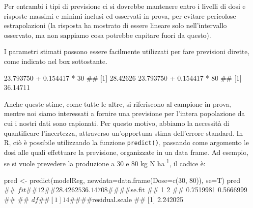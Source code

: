 \documentclass[a4paper,12pt,oneside]{book}
\newenvironment{Shaded}{\begin{snugshade}}{\end{snugshade}}
\newcommand{\DecValTok}[1]{#1}
\newcommand{\FloatTok}[1]{#1}
\newcommand{\SpecialCharTok}[1]{#1}
\newcommand{\DocumentationTok}[1]{#1}
\newcommand{\OtherTok}[1]{#1}
\newcommand{\FunctionTok}[1]{#1}
\newcommand{\AttributeTok}[1]{#1}
\newcommand{\NormalTok}[1]{#1}
\begin{document}
Per entrambi i tipi di previsione ci si dovrebbe mantenere entro i livelli di dosi e risposte massimi e minimi inclusi ed osservati in prova, per evitare pericolose estrapolazioni (la risposta ha mostrato di essere lineare solo nell'intervallo osservato, ma non sappiamo cosa potrebbe capitare fuori da questo).

I parametri stimati possono essere facilmente utilizzati per fare previsioni dirette, come indicato nel box sottostante.

\begin{Shaded}
\begin{Highlighting}[]
\FloatTok{23.793750} \SpecialCharTok{+} \FloatTok{0.154417} \SpecialCharTok{*} \DecValTok{30}
\DocumentationTok{\#\# [1] 28.42626}
\FloatTok{23.793750} \SpecialCharTok{+} \FloatTok{0.154417} \SpecialCharTok{*} \DecValTok{80}
\DocumentationTok{\#\# [1] 36.14711}
\end{Highlighting}
\end{Shaded}

Anche queste stime, come tutte le altre, si riferiscono al campione in prova, mentre noi siamo interessati a fornire una previsione per l'intera popolazione da cui i nostri dati sono capionati. Per questo motivo, abbiamo la necessità di quantificare l'incertezza, attraverso un'opportuna stima dell'errore standard. In R, ciò è possibile utilizzando la funzione \texttt{predict()}, passando come argomento le dosi alle quali effettuare la previsione, organizzate in un data frame. Ad esempio, se si vuole prevedere la produzione a 30 e 80 kg N ha\textsuperscript{-1}, il codice è:

\begin{Shaded}
\begin{Highlighting}[]
\NormalTok{pred }\OtherTok{\textless{}{-}} \FunctionTok{predict}\NormalTok{(modelReg, }\AttributeTok{newdata=}\FunctionTok{data.frame}\NormalTok{(}\AttributeTok{Dose=}\FunctionTok{c}\NormalTok{(}\DecValTok{30}\NormalTok{, }\DecValTok{80}\NormalTok{)), }\AttributeTok{se=}\NormalTok{T)}
\NormalTok{pred}
\DocumentationTok{\#\# $fit}
\DocumentationTok{\#\#        1        2 }
\DocumentationTok{\#\# 28.42625 36.14708 }
\DocumentationTok{\#\# }
\DocumentationTok{\#\# $se.fit}
\DocumentationTok{\#\#         1         2 }
\DocumentationTok{\#\# 0.7519981 0.5666999 }
\DocumentationTok{\#\# }
\DocumentationTok{\#\# $df}
\DocumentationTok{\#\# [1] 14}
\DocumentationTok{\#\# }
\DocumentationTok{\#\# $residual.scale}
\DocumentationTok{\#\# [1] 2.242025}
\end{Highlighting}
\end{Shaded}
\end{document}
